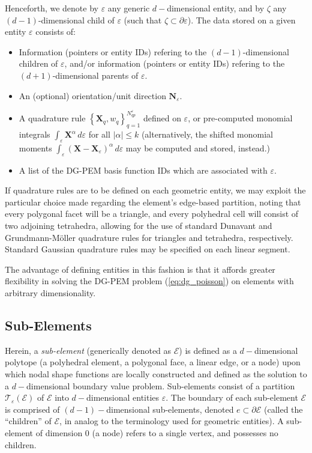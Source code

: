 	Henceforth, we denote by $\varepsilon$ any generic $d-$dimensional entity, and by $\zeta$ any $(d-1)$-dimensional child of $\varepsilon$ (such that $\zeta \subset \partial \varepsilon$). The data stored on a given entity $\varepsilon$ consists of:
	\begin{itemize}
		\item Information (pointers or entity IDs) refering to the $(d-1)$-dimensional children of $\varepsilon$, and/or information (pointers or entity IDs) refering to the $(d+1)$-dimensional parents of $\varepsilon$.
		\item An (optional) orientation/unit direction $\mathbf{N}_\varepsilon$.
		\item A quadrature rule $\left\{ \mathbf{X}_q, w_q \right\}_{q=1}^{N^{\varepsilon}_{qp}}$ defined on $\varepsilon$, or pre-computed monomial integrals $\int_{\varepsilon} \mathbf{X}^\alpha \, d \varepsilon$ for all $|\alpha| \leq k$ (alternatively, the shifted monomial moments $\int_{\varepsilon} (\mathbf{X}-\mathbf{X}_{\varepsilon})^\alpha \, d \varepsilon$ may be computed and stored, instead.)
		\item A list of the DG-PEM basis function IDs which are associated with $\varepsilon$.
	\end{itemize}
	
	If quadrature rules are to be defined on each geometric entity, we may exploit the particular choice made regarding the element's edge-based partition, noting that every polygonal facet will be a triangle, and every polyhedral cell will consist of two adjoining tetrahedra, allowing for the use of standard Dunavant \cite{Dunavant:85} and Grundmann-M\"{o}ller \cite{Grundmann:78} quadrature rules for triangles and tetrahedra, respectively. Standard Gaussian quadrature rules may be specified on each linear segment.
	
	The advantage of defining entities in this fashion is that it affords greater flexibility in solving the DG-PEM problem (\ref{eq:dg_poisson}) on elements with arbitrary dimensionality.
	
\subsection*{Sub-Elements}

	Herein, a \textit{sub-element} (generically denoted as $\mathcal{E}$) is defined as a $d-$dimensional polytope (a polyhedral element, a polygonal face, a linear edge, or a node) upon which nodal shape functions are locally constructed and defined as the solution to a $d-$dimensional boundary value problem. Sub-elements consist of a partition $\mathcal{T}_{\varepsilon} (\mathcal{E})$ of $\mathcal{E}$ into $d-$dimensional entities $\varepsilon$. The boundary of each sub-element $\mathcal{E}$ is comprised of $(d-1)-$dimensional sub-elements, denoted $e \subset \partial \mathcal{E}$ (called the ``children'' of $\mathcal{E}$, in analog to the terminology used for geometric entities). A sub-element of dimension $0$ (a node) refers to a single vertex, and possesses no children.
	
